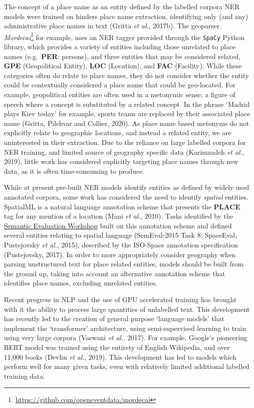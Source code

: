 \documentclass[
  letterpaper,
  11pt,
  english,
  onehalfspacing,
  headsepline]{MastersDoctoralThesis}
\begin{document}
The concept of a place name as an entity defined by the labelled corpora
NER models were trained on hinders place name extraction, identifying
only (and any) administrative place names in text (Gritta \emph{et al.},
2017b). The geoparser \emph{Mordecai}\footnote{\url{https://github.com/openeventdata/mordecai}}
for example, uses an NER tagger provided through the \texttt{SpaCy}
Python library, which provides a variety of entities including those
unrelated to place names (e.g.~\textbf{PER}: persons), and three
entities that may be considered related, \textbf{GPE} (Geopolitical
Entity), \textbf{LOC} (Location), and \textbf{FAC} (Facility). While
these categories often do relate to place names, they do not consider
whether the entity could be contextually considered a place name that
could be geo-located. For example, geopolitical entities are often used
in a metonymic sense; a figure of speech where a concept is substituted
by a related concept. In the phrase `Madrid plays Kiev today' for
example, sports teams are replaced by their associated place name
(Gritta, Pilehvar and Collier, 2020). As place name based metonyms do
not explicitly relate to geographic locations, and instead a related
entity, we are uninterested in their extraction. Due to the reliance on
large labelled corpora for NER training, and limited source of geography
specific data (Karimzadeh \emph{et al.}, 2019), little work has
considered explicitly targeting place names through new data, as it is
often time-consuming to produce.

While at present pre-built NER models identify entities as defined by
widely used annotated corpora, some work has considered the need to
identify \emph{spatial} entities. SpatialML is a natural language
annotation scheme that presents the \textbf{PLACE} tag for any mention
of a location (Mani \emph{et al.}, 2010). Tasks identified by the
\href{https://semeval.github.io/}{Semantic Evaluation Workshop} built on
this annotation scheme and defined several entities relating to spatial
language (SemEval-2015 Task 8: SpaceEval, Pustejovsky \emph{et al.},
2015), described by the ISO-Space annotation specification (Pustejovsky,
2017). In order to more appropriately consider geography when parsing
unstructured text for place related entities, models should be built
from the ground up, taking into account an alternative annotation scheme
that identifies place names, excluding unrelated entities.

Recent progress in NLP and the use of GPU accelerated training has
brought with it the ability to process large quantities of unlabelled
text. This development has recently led to the creation of general
purpose `language models' that implement the `transformer' architecture,
using semi-supervised learning to train using very large corpora
(Vaswani \emph{et al.}, 2017). For example, Google's pioneering BERT
model was trained using the entirety of English Wikipedia, and over
11,000 books (Devlin \emph{et al.}, 2019). This development has led to
models which perform well for many given tasks, even with relatively
limited additional labelled training data.
\end{document}
